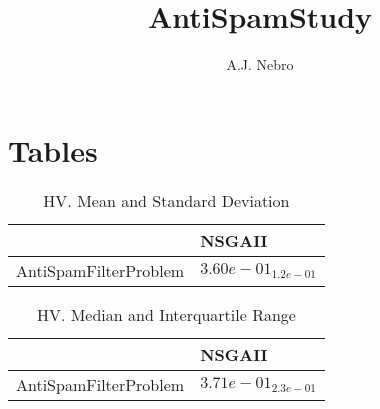 \documentclass{article}
\title{AntiSpamStudy}
\author{A.J. Nebro}
\begin{document}
\maketitle
\section{Tables}

\begin{table}
\caption{HV. Mean and Standard Deviation}
\label{table: HV}
\centering
\begin{scriptsize}
\begin{tabular}{ll}
\hline &  NSGAII\\
\hline 
AntiSpamFilterProblem & \cellcolor{gray95}$  3.60e-01_{ 1.2e-01}$ \\
\hline
\end{tabular}
\end{scriptsize}
\end{table}

\begin{table}
\caption{HV. Median and Interquartile Range}
\label{table: HV}
\centering
\begin{scriptsize}
\begin{tabular}{ll}
\hline &  NSGAII\\
\hline 
AntiSpamFilterProblem & \cellcolor{gray95}$  3.71e-01_{ 2.3e-01}$ \\
\hline
\end{tabular}
\end{scriptsize}
\end{table}
\end{document}
